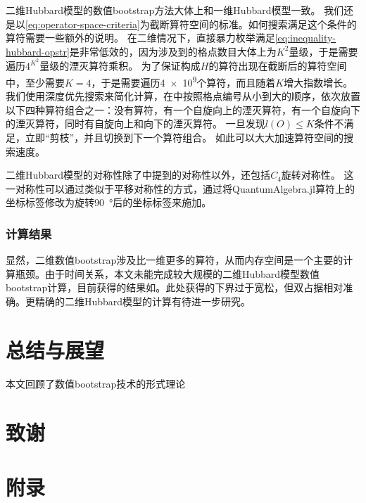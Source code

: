 \documentclass[oneside]{fduthesis}
\begin{document}
二维Hubbard模型的数值bootstrap方法大体上和一维Hubbard模型一致。
我们还是以\eqref{eq:operator-space-criteria}为截断算符空间的标准。如何搜索满足这个条件的算符需要一些额外的说明。
在二维情况下，直接暴力枚举满足\eqref{eq:inequality-hubbard-opstr}是非常低效的，因为涉及到的格点数目大体上为$K^2$量级，于是需要遍历$4^{K^2}$量级的湮灭算符乘积。
为了保证构成$H$的算符出现在截断后的算符空间中，至少需要$K=4$，于是需要遍历\num{4e9}个算符，而且随着$K$增大指数增长。
我们使用深度优先搜索来简化计算，在中按照格点编号从小到大的顺序，依次放置以下四种算符组合之一：没有算符，有一个自旋向上的湮灭算符，有一个自旋向下的湮灭算符，同时有自旋向上和向下的湮灭算符。
一旦发现$l(O) \leq K$条件不满足，立即“剪枝”，并且切换到下一个算符组合。
如此可以大大加速算符空间的搜索速度。

二维Hubbard模型的对称性除了中提到的对称性以外，还包括$C_4$旋转对称性。
这一对称性可以通过类似于平移对称性的方式，通过将QuantumAlgebra.jl算符上的坐标标签修改为旋转\SI{90}{\degree}后的坐标标签来施加。

\subsection{计算结果}



显然，二维数值bootstrap涉及比一维更多的算符，从而内存空间是一个主要的计算瓶颈。由于时间关系，本文未能完成较大规模的二维Hubbard模型数值bootstrap计算，目前获得的结果如。此处获得的下界过于宽松，但双占据相对准确。更精确的二维Hubbard模型的计算有待进一步研究。

\chapter{总结与展望}

本文回顾了数值bootstrap技术的形式理论

\backmatter

\printbibliography

\chapter{致\quad 谢}

\chapter{附\quad 录}
\end{document}
